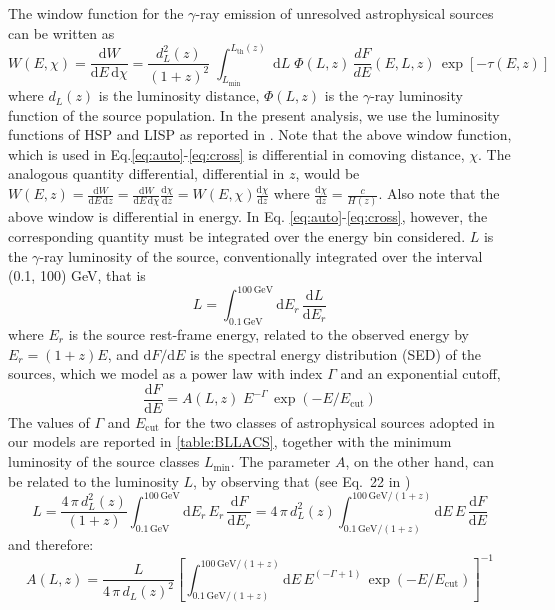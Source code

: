 \documentclass[aps,prd,a4paper,reprint,nofootinbib,superscriptaddress,floatfix,preprintnumbers]{revtex4-2}
\newcommand{\de}{\textrm{d}}
\newcommand{\be}{\begin{equation}}
\newcommand{\ee}{\end{equation}}
\let\Gamma\varGamma
\let\Phi\varPhi
\begin{document}
The window function for the $\gamma$-ray emission of unresolved astrophysical sources can be written as
\begin{equation}
    W(E, \chi) =  \frac{\de W}{\de E\,\de\chi} = \frac{d_L^2(z)}{\left(1+z \right)^2} \; \int_{L_\textrm{min}}^{L_\textrm{th}(z)} \;  \de L \; \Phi(L,z) \, \frac{d F}{d E}(E,L,z) \, \exp[-\tau(E,z)] 
    \label{eq:window_astro}
\end{equation}
where $d_L(z)$ is the luminosity distance, $\Phi(L,z)$ is the $\gamma$-ray luminosity function of the source population. In the present analysis, we use the luminosity functions of HSP and LISP as reported in \cite{DiMauro:2013zfa}.
Note that the above window function, which is used in Eq.\ref{eq:auto}-\ref{eq:cross} is differential in comoving distance, $\chi$. The analogous quantity differential, differential in $z$, would be $W(E,z)=\frac{\de W}{\de E\,\de z} = \frac{\de W}{\de E\,\de\chi} \frac{\de\chi}{\de z} = W(E,\chi) \frac{\de\chi}{\de z}$ where $\frac{\de\chi}{\de z} = \frac{c}{H(z)}$. Also note that the above window is differential in energy. In Eq. \ref{eq:auto}-\ref{eq:cross}, however, the corresponding quantity must be integrated over the energy bin considered. $L$ is the $\gamma$-ray luminosity of the source, conventionally integrated over the interval (0.1, 100) GeV, that is
\be
L = \int_{0.1\, \textrm{GeV}}^{100\, \textrm{GeV}} \de E_r \, \frac{\de L}{\de E_r}
\ee
where $E_r$ is the source rest-frame energy, related to the observed energy by $E_r = (1+z) E$, and $\de F/\de E$ is the spectral energy distribution (SED) of the sources, which we model as a power law with index $\Gamma$ and an exponential cutoff,
\begin{equation}
\frac{\de F}{\de E} = A(L,z) \; E^{-\Gamma} \, \exp(-E/E_\textrm{cut})
\label{eq:SED}
\end{equation}
The values of $\Gamma$ and $E_\textrm{cut}$ for the two classes of astrophysical sources adopted in our models are reported in \cref{table:BLLACS}, together with the minimum luminosity of the source classes $L_\textrm{min}$. The parameter $A$, on the other hand, can be related to the luminosity $L$, by observing that (see Eq.\ 22 in \cite{Hogg:1999ad})
\be
L = \frac{4\,\pi\,d_L^2(z)}{(1+z)} \int_{0.1\, \textrm{GeV}}^{100\, \textrm{GeV}} \de E_r \, E_r \, \frac{\de F}{\de E_r} = 4\,\pi\,d_L^2(z) \int_{0.1\, \textrm{GeV}/(1+z)}^{100\, \textrm{GeV}/(1+z)} \de E \, E \, \frac{\de F}{\de E}
\label{eq:luminosity}
\ee
and therefore:
\be
A(L,z) = \frac{L}{4\,\pi\,d_L(z)^2} 
\left[ 
\int_{0.1\, \textrm{GeV}/(1+z)}^{100\, \textrm{GeV}/(1+z)} 
\de E \,  E^{(-\Gamma + 1)} \, \exp(-E/E_\textrm{cut}) \right]^{-1}
\ee
\end{document}
